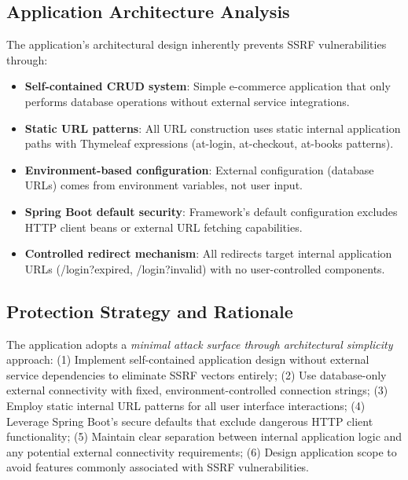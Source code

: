 \documentclass[]{UCD_CS_FYP_Report}
\begin{document}
\subsection{Application Architecture Analysis}
The application's architectural design inherently prevents SSRF vulnerabilities through:
\begin{itemize}
	\item \textbf{Self-contained CRUD system}: Simple e-commerce application that only performs database operations without external service integrations.
	\item \textbf{Static URL patterns}: All URL construction uses static internal application paths with Thymeleaf expressions (at-login, at-checkout, at-books patterns).
	\item \textbf{Environment-based configuration}: External configuration (database URLs) comes from environment variables, not user input.
	\item \textbf{Spring Boot default security}: Framework's default configuration excludes HTTP client beans or external URL fetching capabilities.
	\item \textbf{Controlled redirect mechanism}: All redirects target internal application URLs (/login?expired, /login?invalid) with no user-controlled components.
\end{itemize}

\subsection{Protection Strategy and Rationale}
The application adopts a \textit{minimal attack surface through architectural simplicity} approach: (1) Implement self-contained application design without external service dependencies to eliminate SSRF vectors entirely; (2) Use database-only external connectivity with fixed, environment-controlled connection strings; (3) Employ static internal URL patterns for all user interface interactions; (4) Leverage Spring Boot's secure defaults that exclude dangerous HTTP client functionality; (5) Maintain clear separation between internal application logic and any potential external connectivity requirements; (6) Design application scope to avoid features commonly associated with SSRF vulnerabilities.
\end{document}
